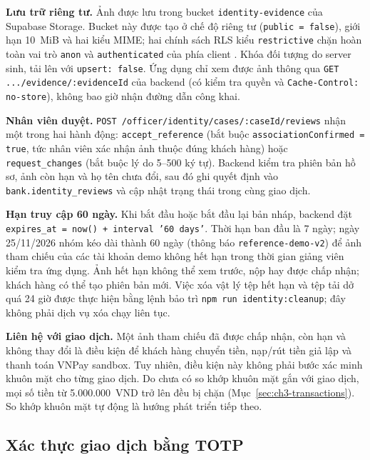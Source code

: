 \textbf{Lưu trữ riêng tư.} Ảnh được lưu trong bucket \texttt{identity-\allowbreak{}evidence} của Supabase Storage. Bucket này được tạo ở chế độ riêng tư (\texttt{public = false}), giới hạn 10~MiB và hai kiểu MIME; hai chính sách RLS kiểu \texttt{restrictive} chặn hoàn toàn vai trò \texttt{anon} và \texttt{authenticated} của phía client \parencite{ch3-supabase-storage}. Khóa đối tượng do server sinh, tải lên với \texttt{upsert: false}. Ứng dụng chỉ xem được ảnh thông qua \texttt{GET .../\allowbreak{}evidence/\allowbreak{}:evidenceId} của backend (có kiểm tra quyền và \texttt{Cache-\allowbreak{}Control: no-\allowbreak{}store}), không bao giờ nhận đường dẫn công khai.

\textbf{Nhân viên duyệt.} \texttt{POST /\allowbreak{}officer/\allowbreak{}identity/\allowbreak{}cases/\allowbreak{}:caseId/\allowbreak{}reviews} nhận một trong hai hành động: \texttt{accept\_\allowbreak{}reference} (bắt buộc \texttt{association\allowbreak{}Confirmed = true}, tức nhân viên xác nhận ảnh thuộc đúng khách hàng) hoặc \texttt{request\_\allowbreak{}changes} (bắt buộc lý do 5--500 ký tự). Backend kiểm tra phiên bản hồ sơ, ảnh còn hạn và họ tên chưa đổi, sau đó ghi quyết định vào \texttt{bank.\allowbreak{}identity\_\allowbreak{}reviews} và cập nhật trạng thái trong cùng giao dịch.

\textbf{Hạn truy cập 60 ngày.} Khi bắt đầu hoặc bắt đầu lại bản nháp, backend đặt \texttt{expires\_\allowbreak{}at = now() + interval '60 days'}. Thời hạn ban đầu là 7 ngày; ngày 25/11/2026 nhóm kéo dài thành 60 ngày (thông báo \texttt{reference-\allowbreak{}demo-\allowbreak{}v2}) để ảnh tham chiếu của các tài khoản demo không hết hạn trong thời gian giảng viên kiểm tra ứng dụng. Ảnh hết hạn không thể xem trước, nộp hay được chấp nhận; khách hàng có thể tạo phiên bản mới. Việc xóa vật lý tệp hết hạn và tệp tải dở quá 24 giờ được thực hiện bằng lệnh bảo trì \texttt{npm run identity:cleanup}; đây không phải dịch vụ xóa chạy liên tục.

\textbf{Liên hệ với giao dịch.} Một ảnh tham chiếu đã được chấp nhận, còn hạn và không thay đổi là điều kiện để khách hàng chuyển tiền, nạp/rút tiền giả lập và thanh toán VNPay sandbox. Tuy nhiên, điều kiện này không phải bước xác minh khuôn mặt cho từng giao dịch. Do chưa có so khớp khuôn mặt gắn với giao dịch, mọi số tiền từ 5.000.000~VND trở lên đều bị chặn (Mục~\ref{sec:ch3-transactions}). So khớp khuôn mặt tự động là hướng phát triển tiếp theo.

\subsection{Xác thực giao dịch bằng TOTP}
\label{sec:ch3-totp}

